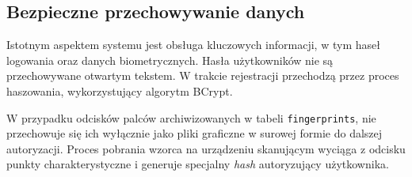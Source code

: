 \subsection{Bezpieczne przechowywanie danych}

Istotnym aspektem systemu jest obsługa kluczowych informacji, w tym haseł logowania oraz danych biometrycznych. Hasła użytkowników nie są przechowywane otwartym tekstem. W trakcie rejestracji przechodzą przez proces haszowania, wykorzystujący algorytm BCrypt.

W przypadku odcisków palców archiwizowanych w tabeli \texttt{fingerprints}, nie przechowuje się ich wyłącznie jako pliki graficzne w surowej formie do dalszej autoryzacji. Proces pobrania wzorca na urządzeniu skanującym wyciąga z odcisku punkty charakterystyczne i generuje specjalny \textit{hash} autoryzujący użytkownika.

